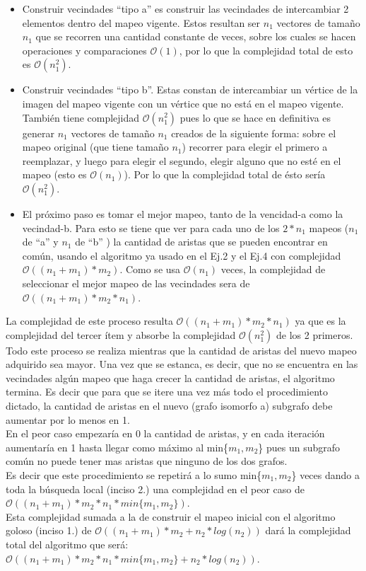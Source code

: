  \begin{itemize}
 \item Construir vecindades ``tipo a'' es construir las vecindades de intercambiar 2 elementos dentro del mapeo vigente. Estos resultan ser $n_1$ vectores de tamaño $n_1$ que se recorren una cantidad constante de veces, sobre los cuales se hacen operaciones y comparaciones $\mathcal{O}(1)$, por lo que la complejidad total de esto es $\mathcal{O}(n_1^2)$.
 \item Construir vecindades ``tipo b''. Estas constan de intercambiar un vértice de la imagen del mapeo vigente con un vértice que no está en el mapeo vigente. También tiene complejidad $\mathcal{O}(n_1^2)$ pues lo que se hace en definitiva es generar $n_1$ vectores de tamaño $n_1$ creados de la siguiente forma: sobre el mapeo original (que tiene tamaño $n_1$) recorrer para elegir el primero a reemplazar, y luego para elegir el segundo, elegir alguno que no esté en el mapeo (esto es $\mathcal{O}(n_1)$). Por lo que la complejidad total de ésto sería $\mathcal{O}(n_1^2)$.
 \item El próximo paso es tomar el mejor mapeo, tanto de la vencidad-a como la vecindad-b. Para esto se tiene que ver para cada uno de los $2*n_1$ mapeos ($n_1$ de ``a'' y $n_1$ de ``b'' ) la cantidad de aristas que se pueden encontrar en común, usando el algoritmo ya usado en el Ej.2 y el Ej.4 con complejidad $\mathcal{O}((n_1+m_1)*m_2)$. Como se usa $\mathcal{O}(n_1)$ veces, la complejidad de seleccionar el mejor mapeo de las vecindades sera de $\mathcal{O}((n_1+m_1)*m_2*n_1)$.
\end{itemize}
La complejidad de este proceso resulta $\mathcal{O}((n_1+m_1)*m_2*n_1)$ ya que es la complejidad del tercer ítem y absorbe la complejidad $\mathcal{O}(n_1^2)$ de los 2 primeros.\\
Todo este proceso se realiza mientras que la cantidad de aristas del nuevo mapeo adquirido sea mayor. Una vez que se estanca, es decir, que no se encuentra en las vecindades algún mapeo que haga crecer la cantidad de aristas, el algoritmo termina. Es decir que para que se itere una vez más todo el procedimiento dictado, la cantidad de aristas en el nuevo (grafo isomorfo a) subgrafo debe aumentar por lo menos en 1.\\
En el peor caso empezaría en 0 la cantidad de aristas, y en cada iteración aumentaría en 1 hasta llegar como máximo al min\{$m_1,m_2$\} pues un subgrafo común no puede tener mas aristas que ninguno de los dos grafos.\\
Es decir que este procedimiento se repetirá a lo sumo min\{$m_1,m_2$\} veces dando a toda la búsqueda local (inciso 2.) una complejidad en el peor caso de $\mathcal{O}((n_1+m_1)*m_2*n_1*min\{m_1,m_2\})$.\\
Esta complejidad sumada a la de construir el mapeo inicial con el algoritmo goloso (inciso 1.) de $\mathcal{O}((n_1+m_1)*m_2+n_2*log(n_2))$ dará la complejidad total del algoritmo que será: \\
$\mathcal{O}((n_1+m_1)*m_2*n_1*min\{m_1,m_2\}+n_2*log(n_2))$.



